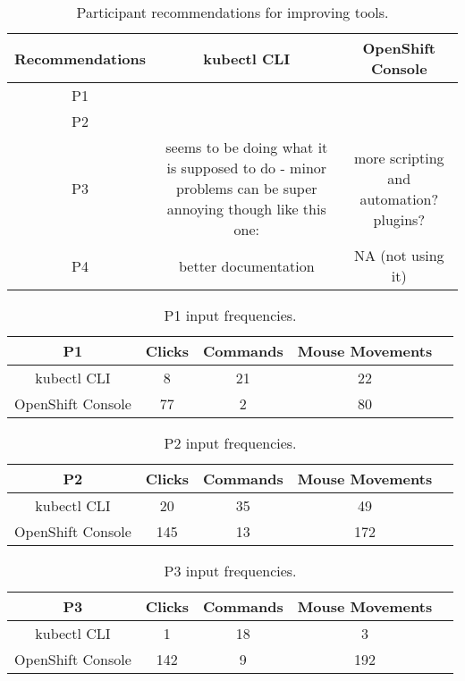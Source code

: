 \documentclass[11pt, oneside]{article}   	%
\begin{document}
\begin{table}
 \centering
  \begin{tabular}{ | c | c | c | } 
  \hline
  Recommendations & kubectl CLI & OpenShift Console \\ 
  \hline
  P1 &  &  \\ 
  \hline
  P2 & & \\
  \hline
  P3 & seems to be doing what it is supposed to do - minor problems can be super annoying though like this one: \href{https://github.com/kubernetes/kubernetes/issues/42552} & more scripting and automation? plugins? \\
  \hline
  P4 & better documentation & NA (not using it) \\
  \hline
  \end{tabular}
 \caption{Participant recommendations for improving tools.}
 \label{table:t10}
\end{table}

\begin{table}
 \centering
  \begin{tabular}{ | c | c | c | c | c | }
  \hline
  P1 & Clicks & Commands & Mouse Movements \\ 
  \hline
  kubectl CLI & 8 & 21 & 22 \\ 
  \hline
  OpenShift Console & 77 & 2 & 80 \\ 
  \hline
  \end{tabular}
 \caption{P1 input frequencies.}
 \label{table:t1}
\end{table}

\begin{table}
 \centering
  \begin{tabular}{ | c | c | c | c | c | } 
  \hline
  P2 & Clicks & Commands & Mouse Movements \\ 
  \hline
  kubectl CLI & 20 & 35 & 49 \\ 
  \hline
  OpenShift Console & 145 & 13 & 172 \\ 
  \hline
  \end{tabular}
 \caption{P2 input frequencies.}
 \label{table:t2}
\end{table}

\begin{table}
 \centering
  \begin{tabular}{ | c | c | c | c | c | } 
  \hline
  P3 & Clicks & Commands & Mouse Movements \\ 
  \hline
  kubectl CLI & 1 & 18 & 3 \\ 
  \hline
  OpenShift Console & 142 & 9 & 192 \\ 
  \hline
  \end{tabular}
 \caption{P3 input frequencies.}
 \label{table:t3}
\end{table}
\end{document}
